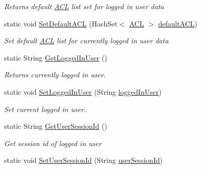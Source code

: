 \begin{DoxyCompactItemize}
\begin{DoxyCompactList}\small\item\em Returns default \hyperlink{classcom_1_1shephertz_1_1app42_1_1paas_1_1sdk_1_1csharp_1_1_a_c_l}{A\+C\+L} list set for logged in user data \end{DoxyCompactList}\item 
static void \hyperlink{classcom_1_1shephertz_1_1app42_1_1paas_1_1sdk_1_1csharp_1_1_app42_a_p_i_ad5736f5017bf3fa83acb8cf47fe8ca84}{Set\+Default\+A\+C\+L} (Hash\+Set$<$ \hyperlink{classcom_1_1shephertz_1_1app42_1_1paas_1_1sdk_1_1csharp_1_1_a_c_l}{A\+C\+L} $>$ \hyperlink{classcom_1_1shephertz_1_1app42_1_1paas_1_1sdk_1_1csharp_1_1_app42_a_p_i_a8ccfacd2b83f6020e0bfda37a46c8bfd}{default\+A\+C\+L})
\begin{DoxyCompactList}\small\item\em Set default \hyperlink{classcom_1_1shephertz_1_1app42_1_1paas_1_1sdk_1_1csharp_1_1_a_c_l}{A\+C\+L} list for currently logged in user data \end{DoxyCompactList}\item 
static String \hyperlink{classcom_1_1shephertz_1_1app42_1_1paas_1_1sdk_1_1csharp_1_1_app42_a_p_i_a40ad8fc8d99bc23d1c869c99064edd0d}{Get\+Logged\+In\+User} ()
\begin{DoxyCompactList}\small\item\em Returns currently logged in user. \end{DoxyCompactList}\item 
static void \hyperlink{classcom_1_1shephertz_1_1app42_1_1paas_1_1sdk_1_1csharp_1_1_app42_a_p_i_a52e13386f98adb206124cc8d7e41b86c}{Set\+Logged\+In\+User} (String \hyperlink{classcom_1_1shephertz_1_1app42_1_1paas_1_1sdk_1_1csharp_1_1_app42_a_p_i_a5efb35bfcc658eb5eea3661759c2e369}{logged\+In\+User})
\begin{DoxyCompactList}\small\item\em Set current logged in user. \end{DoxyCompactList}\item 
static String \hyperlink{classcom_1_1shephertz_1_1app42_1_1paas_1_1sdk_1_1csharp_1_1_app42_a_p_i_ac7f8393947647c2c3351511c71c49dd7}{Get\+User\+Session\+Id} ()
\begin{DoxyCompactList}\small\item\em Get session id of logged in user \end{DoxyCompactList}\item 
static void \hyperlink{classcom_1_1shephertz_1_1app42_1_1paas_1_1sdk_1_1csharp_1_1_app42_a_p_i_a63aee9fb4c4ea1e313882b2d5301f408}{Set\+User\+Session\+Id} (String \hyperlink{classcom_1_1shephertz_1_1app42_1_1paas_1_1sdk_1_1csharp_1_1_app42_a_p_i_aff787448095619d43e069be4e1bffed2}{user\+Session\+Id})

\end{DoxyCompactItemize}

